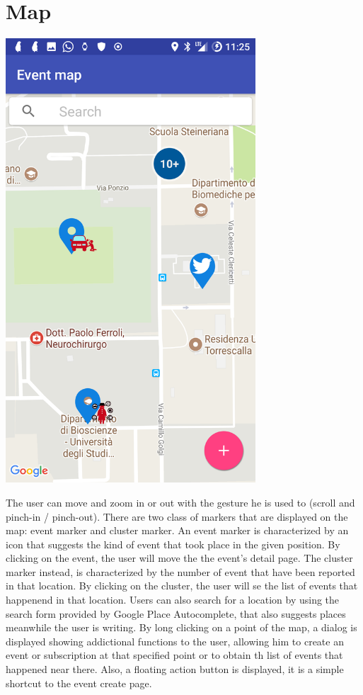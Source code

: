 \documentclass[a4paper]{scrreprt}
\begin{document}
\section{Map}
\begin{minipage}{0.5\textwidth}
	\centering
	\includegraphics[width=0.7\textwidth]{event_map}
\end{minipage}
\begin{minipage}{0.5\textwidth}
	 The user can move and zoom in or out with the gesture he is used to (scroll and pinch-in / pinch-out). There are two class of markers that are displayed on the map: event marker and cluster marker. An event marker is characterized by an icon that suggests the kind of event that took place in the given position. By clicking on the event, the user will move the the event's detail page. The cluster marker instead, is characterized by the number of event that have been reported in that location. By clicking on the cluster, the user will se the list of events that happenend in that location. Users can also search for a  location by using the search form provided by Google Place Autocomplete, that also suggests places meanwhile the user is writing. By long clicking on a point of the map, a dialog is displayed showing addictional functions to the user, allowing him to create an event or subscription at that specified point or to obtain th list of events that happened near there. Also, a floating action button is displayed, it is a simple shortcut to the event create page.
\end{minipage}
\end{document}
